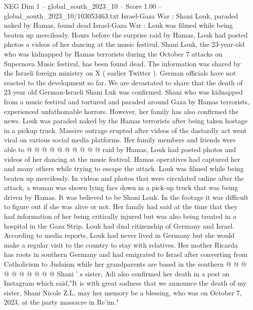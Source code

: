 \begin{textsample}{NEG Dim 1 – global\_south\_2023\_10 – Score 1.00 – global\_south\_2023\_10/103053463.txt}  \label{ex:f1_neg_397}
Israel-Gaza War : Shani Louk, paraded naked by Hamas, found dead Israel-Gaza War : Louk was filmed while being beaten up mercilessly.
Hours before the surprise raid by Hamas, Louk had posted photos a videos of her dancing at the music festival.
Shani Louk, the 23-year-old who was kidnapped by Hamas terrorists during the October 7 attacks on Supernova Music festival, has been found dead.
The information was shared by the Israeli foreign ministry on X ( earlier Twitter ).
German officials have not reacted to the development so far.
We are devastated to share that the death of 23 year old German-Israeli Shani Luk was confirmed.
Shani who was kidnapped from a music festival and tortured and paraded around Gaza by Hamas terrorists, experienced unfathomable horrors.
However, her family has also confirmed the news.
Louk was paraded naked by the Hamas terrorists after being taken hostage in a pickup truck.
Massive outrage erupted after videos of the dastardly act went viral on various social media platforms.
Her family members and friends were able to @ @ @ @ @ @ @ @ @ @ raid by Hamas, Louk had posted photos and videos of her dancing at the music festival.
Hamas operatives had captured her and many others while trying to escape the attack.
Louk was filmed while being beaten up mercilessly.
In videos and photos that were circulated online after the attack, a woman was shown lying face down in a pick-up truck that was being driven by Hamas.
It was believed to be Shani Louk.
In the footage it was difficult to figure out if she was alive or not.
Her family had said at the time that they had information of her being critically injured but was also being treated in a hospital in the Gaza Strip.
Louk had dual citizenship of Germany and Israel.
According to media reports, Louk had never lived in Germany but she would make a regular visit to the country to stay with relatives.
Her mother Ricarda has roots in southern Germany and had emigrated to Israel after converting from Catholicism to Judaism while her grandparents are based in the southern @ @ @ @ @ @ @ @ @ @ Shani ' s sister, Adi also confirmed her death in a post on Instagram which said,"It is with great sadness that we announce the death of my sister, Shani Nicole Z.L. may her memory be a blessing, who was on October 7, 2023, at the party massacre in Re'im."

\end{textsample}
